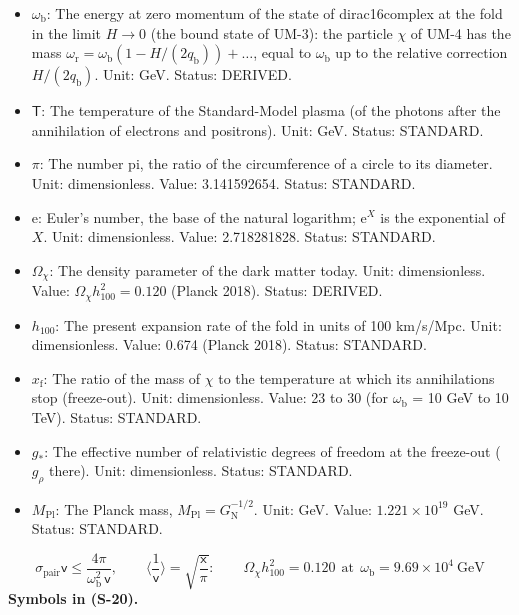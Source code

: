 \documentclass[
  10pt,
]{article}
\begin{document}
\begin{itemize}
  the fold that are in thermal equilibrium. Unit: dimensionless. Value:
  8 (four particles and four antiparticles). Status: DERIVED.
\item
  \(\omega_{\mathrm{b}}\): The energy at zero momentum of the state of
  dirac16complex at the fold in the limit \(H \to 0\) (the bound state
  of UM-3): the particle \(\chi\) of UM-4 has the mass
  \(\omega_{\mathrm{r}} = \omega_{\mathrm{b}}(1 - H/(2q_{\mathrm{b}})) + \dots\),
  equal to \(\omega_{\mathrm{b}}\) up to the relative correction
  \(H/(2q_{\mathrm{b}})\). Unit: GeV. Status: DERIVED.
\item
  \(\mathsf{T}\): The temperature of the Standard-Model plasma (of the
  photons after the annihilation of electrons and positrons). Unit: GeV.
  Status: STANDARD.
\item
  \(\pi\): The number pi, the ratio of the circumference of a circle to
  its diameter. Unit: dimensionless. Value: 3.141592654. Status:
  STANDARD.
\item
  \(\mathrm{e}\): Euler's number, the base of the natural logarithm;
  \(\mathrm{e}^{X}\) is the exponential of \(X\). Unit: dimensionless.
  Value: 2.718281828. Status: STANDARD.
\item
  \(\Omega_\chi\): The density parameter of the dark matter today. Unit:
  dimensionless. Value: \(\Omega_\chi h_{100}^2 = 0.120\) (Planck 2018).
  Status: DERIVED.
\item
  \(h_{100}\): The present expansion rate of the fold in units of 100
  km/s/Mpc. Unit: dimensionless. Value: 0.674 (Planck 2018). Status:
  STANDARD.
\item
  \(x_{\mathrm{f}}\): The ratio of the mass of \(\chi\) to the
  temperature at which its annihilations stop (freeze-out). Unit:
  dimensionless. Value: 23 to 30 (for \(\omega_{\mathrm{b}}\) = 10 GeV
  to 10 TeV). Status: STANDARD.
\item
  \(g_*\): The effective number of relativistic degrees of freedom at
  the freeze-out (\(g_\rho\) there). Unit: dimensionless. Status:
  STANDARD.
\item
  \(M_{\mathrm{Pl}}\): The Planck mass,
  \(M_{\mathrm{Pl}} = G_{\mathrm{N}}^{-1/2}\). Unit: GeV. Value:
  \(1.221\times10^{19}\) GeV. Status: STANDARD.
\end{itemize}

\[
\sigma_{\mathrm{pair}}\mathsf{v} \le \frac{4\pi}{\omega_{\mathrm{b}}^2\,\mathsf{v}},\qquad \Big\langle\frac{1}{\mathsf{v}}\Big\rangle = \sqrt{\frac{\mathsf{x}}{\pi}}:\qquad
\Omega_\chi h_{100}^2 = 0.120\ \ \text{at}\ \ \omega_{\mathrm{b}} = 9.69\times10^4\ \text{GeV} \tag{S-20}
\] \textbf{Symbols in (S-20).}
\end{document}
